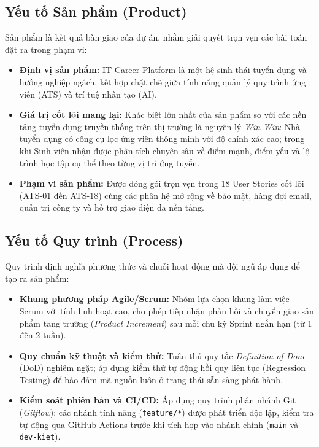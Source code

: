 \subsection{Yếu tố Sản phẩm (Product)}
Sản phẩm là kết quả bàn giao của dự án, nhằm giải quyết trọn vẹn các bài toán đặt ra trong phạm vi:
\begin{itemize}
    \item \textbf{Định vị sản phẩm:} IT Career Platform là một hệ sinh thái tuyển dụng và hướng nghiệp ngách, kết hợp chặt chẽ giữa tính năng quản lý quy trình ứng viên (ATS) và trí tuệ nhân tạo (AI).
    \item \textbf{Giá trị cốt lõi mang lại:} Khác biệt lớn nhất của sản phẩm so với các nền tảng tuyển dụng truyền thống trên thị trường là nguyên lý \textit{Win-Win}: Nhà tuyển dụng có công cụ lọc ứng viên thông minh với độ chính xác cao; trong khi Sinh viên nhận được phân tích chuyên sâu về điểm mạnh, điểm yếu và lộ trình học tập cụ thể theo từng vị trí ứng tuyển.
    \item \textbf{Phạm vi sản phẩm:} Được đóng gói trọn vẹn trong 18 User Stories cốt lõi (ATS-01 đến ATS-18) cùng các phân hệ mở rộng về bảo mật, hàng đợi email, quản trị công ty và hỗ trợ giao diện đa nền tảng.
\end{itemize}

\subsection{Yếu tố Quy trình (Process)}
Quy trình định nghĩa phương thức và chuỗi hoạt động mà đội ngũ áp dụng để tạo ra sản phẩm:
\begin{itemize}
    \item \textbf{Khung phương pháp Agile/Scrum:} Nhóm lựa chọn khung làm việc Scrum \cite{scrumguide2020} với tính linh hoạt cao, cho phép tiếp nhận phản hồi và chuyển giao sản phẩm tăng trưởng (\textit{Product Increment}) sau mỗi chu kỳ Sprint ngắn hạn (từ 1 đến 2 tuần).
    \item \textbf{Quy chuẩn kỹ thuật và kiểm thử:} Tuân thủ quy tắc \textit{Definition of Done} (DoD) nghiêm ngặt; áp dụng kiểm thử tự động hồi quy liên tục (Regression Testing) để bảo đảm mã nguồn luôn ở trạng thái sẵn sàng phát hành.
    \item \textbf{Kiểm soát phiên bản và CI/CD:} Áp dụng quy trình phân nhánh Git (\textit{Gitflow}): các nhánh tính năng (\texttt{feature/*}) được phát triển độc lập, kiểm tra tự động qua GitHub Actions trước khi tích hợp vào nhánh chính (\texttt{main} và \texttt{dev-kiet}).
\end{itemize}

